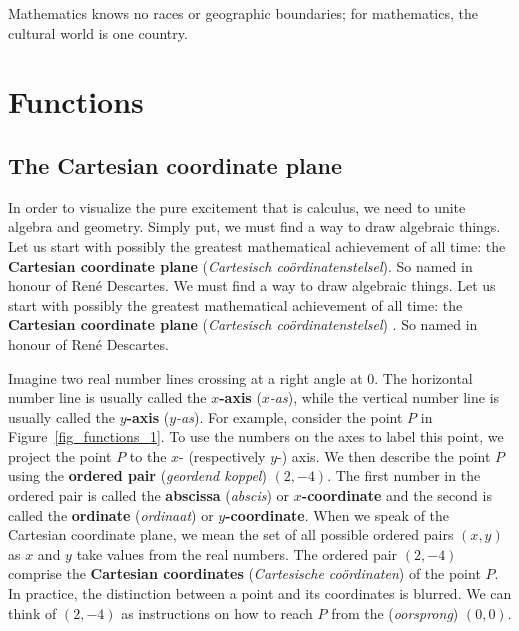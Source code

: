 \begin{savequote}[75mm]
Mathematics knows no races or geographic boundaries; for mathematics, the cultural world is one country.
\end{savequote}

\chapter{Functions}
\label{chap_functions}
\graphicspath{{figures/Functions/}}
\section{The Cartesian coordinate plane}
\label{CartesianPlane}

\ifcourse
In order to visualize the pure excitement that is calculus, we need to unite algebra and geometry.  Simply put, we must find a way to draw algebraic things.  Let us start with possibly the greatest mathematical achievement of all time: the  \textbf{Cartesian coordinate plane} (\textit{Cartesisch co\"ordinatenstelsel}). So named in honour of Ren\'{e} Descartes. 
\fi
\ifvc
We must find a way to draw algebraic things.  Let us start with possibly the greatest mathematical achievement of all time: the  \textbf{Cartesian coordinate plane}  (\textit{Cartesisch co\"ordinatenstelsel}) . So named in honour of Ren\'{e} Descartes. 
\fi


Imagine two real number lines crossing at a right angle at $0$. The horizontal number line is usually called the \textbf{\boldmath $x$-axis} (\textit{$x$-as}), while the vertical number line is usually called the \textbf{\boldmath $y$-axis} (\textit{$y$-as}). For example, consider the point $P$ in Figure~\ref{fig_functions_1}.  To use the numbers on the axes to label this point, we project the point $P$ to the $x$- (respectively $y$-) axis.  We then describe the point $P$ using the  \textbf{ordered pair} (\textit{geordend koppel}) $(2,-4)$.  The first number in the ordered pair is called the \textbf{abscissa} (\textit{abscis}) or  \textbf{\boldmath $x$-coordinate} and the second is called the  \textbf{ordinate} (\textit{ordinaat}) or \textbf{\boldmath $y$-coordinate}. When we speak of the Cartesian coordinate plane, we mean the set of all possible ordered pairs $(x,y)$ as $x$ and $y$ take values from the real numbers.  The ordered pair $(2,-4)$ comprise the \textbf{Cartesian coordinates} (\textit{Cartesische co\"ordinaten}) of the point $P$. In practice, the distinction between a point and its coordinates is blurred.  We can think of $(2,-4)$ as instructions on how to reach $P$ from the  (\textit{oorsprong}) $(0, 0)$. 


